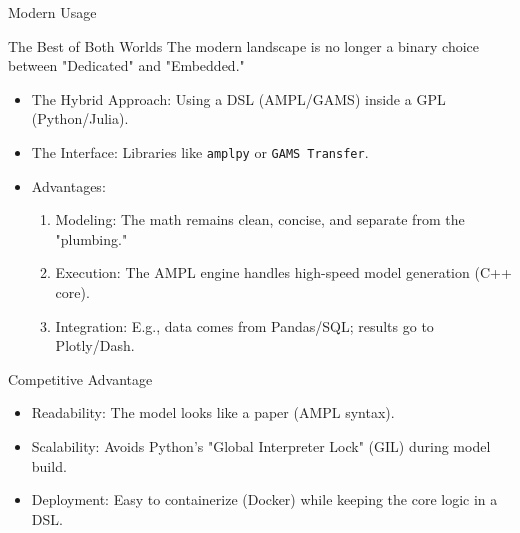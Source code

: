 \documentclass[presentation, aspectratio=169]{beamer}
\begin{document}
\begin{frame}[label={sec:org467223f},fragile]{Modern Usage}
 \begin{block}{The Best of Both Worlds}
The modern landscape is no longer a binary choice between "Dedicated" and "Embedded."
\begin{itemize}
\item \alert{\alert{The Hybrid Approach}}: Using a DSL (AMPL/GAMS) \alert{inside} a GPL (Python/Julia).
\item \alert{\alert{The Interface}}: Libraries like \texttt{amplpy} or \texttt{GAMS Transfer}.
\item \alert{\alert{Advantages}}: 
\begin{enumerate}
\item \alert{\alert{Modeling}}: The math remains clean, concise, and separate from the "plumbing."
\item \alert{\alert{Execution}}: The AMPL engine handles high-speed model generation (C++ core).
\item \alert{\alert{Integration}}: E.g., data comes from Pandas/SQL; results go to Plotly/Dash.
\end{enumerate}
\end{itemize}
\end{block}

\begin{block}{Competitive Advantage}
\begin{itemize}
\item \alert{\alert{Readability}}: The model looks like a paper (AMPL syntax).
\item \alert{\alert{Scalability}}: Avoids Python's "Global Interpreter Lock" (GIL) during model build.
\item \alert{\alert{Deployment}}: Easy to containerize (Docker) while keeping the core logic in a DSL.
\end{itemize}
\end{block}
\end{frame}
\end{document}
